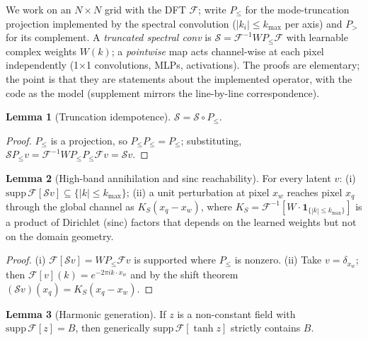 \documentclass[11pt]{article}
\theoremstyle{definition}
\newtheorem{lemma}{Lemma}
\begin{document}
We work on an $N \times N$ grid with the DFT $\mathcal{F}$; write
$P_{\le}$ for the mode-truncation projection implemented by the spectral
convolution ($|k_i| \le k_{\max}$ per axis) and $P_{>}$ for its complement.
A \emph{truncated spectral conv} is $\mathcal{S} = \mathcal{F}^{-1} W
P_{\le} \mathcal{F}$ with learnable complex weights $W(k)$; a \emph{pointwise}
map acts channel-wise at each pixel independently (1$\times$1 convolutions,
MLPs, activations). The proofs are elementary; the point is that they are
statements about the implemented operator, with the code as the model
(supplement \citep{singh2026agfno} mirrors the line-by-line correspondence).

\begin{lemma}[Truncation idempotence]
\label{lem:idem}
$\mathcal{S} = \mathcal{S} \circ P_{\le}$.
\end{lemma}

\begin{proof}
$P_{\le}$ is a projection, so $P_{\le} P_{\le} = P_{\le}$; substituting,
$\mathcal{S} P_{\le} v = \mathcal{F}^{-1} W P_{\le} P_{\le} \mathcal{F} v
= \mathcal{S} v$.
\end{proof}

\begin{lemma}[High-band annihilation and sinc reachability]
\label{lem:annihilate}
For every latent $v$: \textup{(i)} $\mathrm{supp}\, \mathcal{F}[\mathcal{S} v]
\subseteq \{|k| \le k_{\max}\}$; \textup{(ii)} a unit perturbation at pixel
$x_w$ reaches pixel $x_q$ through the global channel as
$K_S(x_q - x_w)$, where $K_S = \mathcal{F}^{-1}[W \cdot
\mathbf{1}_{\{|k| \le k_{\max}\}}]$ is a product of Dirichlet (sinc)
factors that depends on the learned weights but not on the domain geometry.
\end{lemma}

\begin{proof}
(i) $\mathcal{F}[\mathcal{S} v] = W P_{\le} \mathcal{F} v$ is supported where
$P_{\le}$ is nonzero. (ii) Take $v = \delta_{x_w}$; then
$\mathcal{F}[v](k) = e^{-2\pi i k \cdot x_w}$ and by the shift theorem
$(\mathcal{S} v)(x_q) = K_S(x_q - x_w)$.
\end{proof}

\begin{lemma}[Harmonic generation]
\label{lem:harmonic}
If $z$ is a non-constant field with $\mathrm{supp}\,\mathcal{F}[z] = B$, then
generically $\mathrm{supp}\,\mathcal{F}[\tanh z]$ strictly contains $B$.
\end{lemma}
\end{document}

